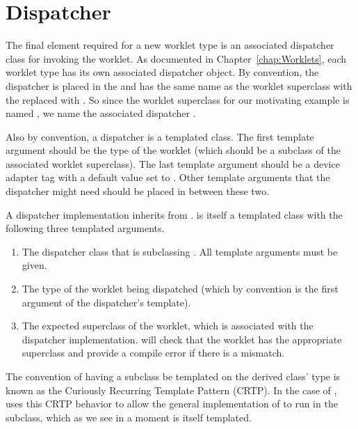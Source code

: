 \section{Dispatcher}
\label{sec:NewWorkletTypes:Dispatcher}


The final element required for a new worklet type is an associated dispatcher class for invoking the worklet.
As documented in Chapter~\ref{chap:Worklets}, each worklet type has its own associated dispatcher object.
By convention, the dispatcher is placed in the \vtkmworklet{} and has the same name as the worklet superclass with the  replaced with .
So since the worklet superclass for our motivating example is named , we name the associated dispatcher .

Also by convention, a dispatcher is a templated class.
The first template argument should be the type of the worklet (which should be a subclass of the associated worklet superclass).
The last template argument should be a device adapter tag with a default value set to .
Other template arguments that the dispatcher might need should be placed in between these two.


A dispatcher implementation inherits from .
 is itself a templated class with the following three templated arguments.
\begin{enumerate}
\item
  The dispatcher class that is subclassing .
  All template arguments must be given.
\item
  The type of the worklet being dispatched (which by convention is the first argument of the dispatcher's template).
\item
  The expected superclass of the worklet, which is associated with the dispatcher implementation.
   will check that the worklet has the appropriate superclass and provide a compile error if there is a mismatch.
\end{enumerate}

\begin{didyouknow}
  The convention of having a subclass be templated on the derived class' type is known as the Curiously Recurring Template Pattern (CRTP).
  In the case of , \VTKm uses this CRTP behavior to allow the general implementation of  to run  in the subclass, which as we see in a moment is itself templated.
\end{didyouknow}

